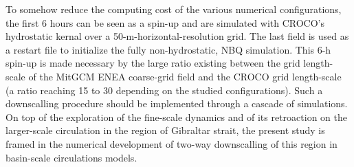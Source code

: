 \color{blue}To somehow reduce the computing cost of the various numerical configurations, the first 6 hours can be seen as a spin-up and are simulated with CROCO's hydrostatic kernal over a 50-m-horizontal-resolution grid. The last field is used as a restart file to initialize the fully non-hydrostatic, NBQ simulation. This 6-h spin-up is made necessary by the large ratio existing between the grid length-scale of the MitGCM ENEA coarse-grid field and the CROCO grid length-scale (a ratio reaching 15 to 30 depending on the studied configurations). Such a downscalling procedure should be implemented through a cascade of simulations. On top of the exploration of the fine-scale dynamics and of its retroaction on the larger-scale circulation in the region of Gibraltar strait, the present study is framed in the numerical development of two-way downscalling of this region in basin-scale circulations models.\color{black}


